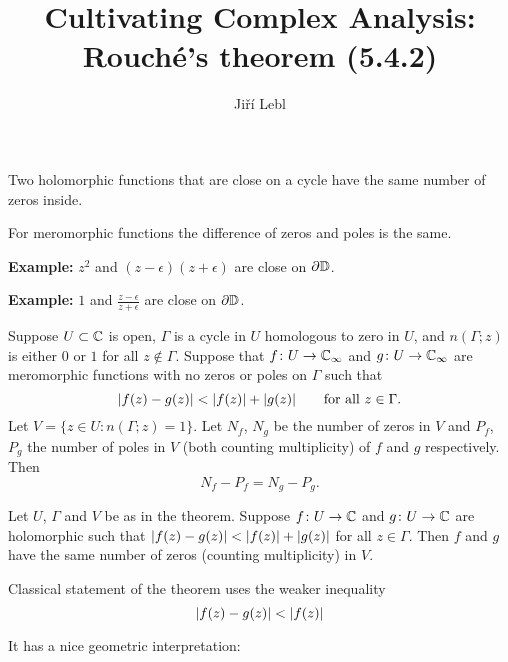 \documentclass[10pt,aspectratio=169]{beamer}
\author{Ji\v{r}\'i Lebl}
\institute[OSU]{%
Departemento pri Matematiko de Oklahoma {\^S}tata Universitato}
\title{Cultivating Complex Analysis:\\%
Rouch\'e's theorem (5.4.2)}
\date{}
\begin{document}
\begin{frame}
\titlepage
\end{frame}

\begin{frame}
Two holomorphic functions that are close on a cycle
have the same number of zeros inside.

\pause
\bigskip

For meromorphic functions the difference of zeros and poles
is the same.

\pause
\bigskip

\textbf{Example:} $z^2$ and $(z-\epsilon)(z+\epsilon)$ are close on $\partial {\mathbb{D}}$.

\pause
\bigskip

\textbf{Example:} $1$ and $\frac{z-\epsilon}{z+\epsilon}$ are close on $\partial {\mathbb{D}}$.

\end{frame}

\begin{frame}
\begin{theorem}[Rouch\'e]
Suppose $U \subset {\mathbb{C}}$ is open, $\Gamma$ is
a cycle in $U$ homologous to zero in $U$,
and $n(\Gamma;z)$ is either $0$ or $1$ for all $z \notin \Gamma$.
\pause
Suppose that $f \colon U \to {\mathbb{C}}_\infty$ and $g \colon U \to {\mathbb{C}}_\infty$
are meromorphic functions with no zeros or poles on
$\Gamma$ such that
\[
\lvert {f(z)-g(z)} \rvert < \lvert {f(z)} \rvert+\lvert {g(z)} \rvert
\qquad
\text{for all } z \in \Gamma .
\]
\pause
Let $V = \{ z \in U : n(\Gamma;z) = 1 \}$.
Let $N_f$, $N_g$ be the number of zeros in $V$
and $P_f$, $P_g$ the number of poles in $V$ (both counting multiplicity)
of $f$ and $g$ respectively.
\pause
Then
\begin{equation*}
N_f - P_f = 
N_g - P_g.
\end{equation*}
\end{theorem}

\pause

\begin{corollary}[Rouch\'e]
Let $U$, $\Gamma$ and $V$ be as in the theorem.
Suppose $f \colon U \to {\mathbb{C}}$ and $g \colon U \to {\mathbb{C}}$
are holomorphic such that
$\lvert {f(z)-g(z)} \rvert < \lvert {f(z)} \rvert+\lvert {g(z)} \rvert$
for all $z \in \Gamma$.  Then $f$ and $g$ have the same number of zeros
(counting multiplicity) in $V$.
\end{corollary}
\end{frame}

\begin{frame}
Classical statement of the theorem uses the weaker inequality
\[
\lvert {f(z)-g(z)} \rvert < \lvert {f(z)} \rvert
\]

\pause

It has a nice geometric interpretation:

\begin{center}
\end{center}

\end{frame}
\end{document}
